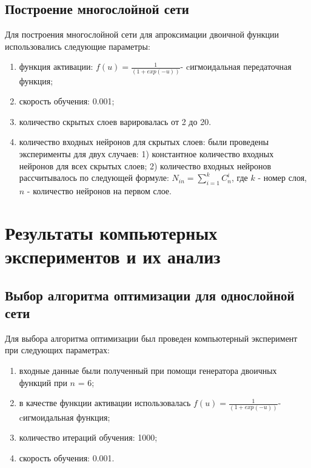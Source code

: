\documentclass[a4paper,12pt,twoside]{article}
\begin{document}
	\subsection{Построение многослойной сети}
	\bigskip
	Для построения многослойной сети для апроксимации двоичной функции использовались следующие параметры:
	\begin{enumerate}
		\item функция активации: $f(u) = \frac{1}{(1 + exp(-u))}$- cигмоидальная передаточная функция;
		\item скорость обучения: 0.001;
		\item количество скрытых слоев варировалась от 2 до 20.
		\item количество входных нейронов для скрытых слоев: были проведены эксперименты для двух случаев: 1) константное количество входных нейронов для всех скрытых слоев; 2) количество входных нейронов рассчитывалось по следующей формуле: $N_{in} = \sum_{i=1}^k C_n^i$, где $k$ - номер слоя, $n$ - количество нейронов на первом слое.
	\end{enumerate}

	\newpage
	\section{Результаты компьютерных экспериментов и их анализ}
		\subsection{Выбор алгоритма оптимизации для однослойной сети}
	Для выбора алгоритма оптимизации был проведен компьютерный эксперимент при следующих параметрах:
	\begin{enumerate}
		\item входные данные были полученный при помощи генератора двоичных функций при $n$ = 6;
		\item в качестве функции активации использовалась $f(u) = \frac{1}{(1 + exp(-u))}$- cигмоидальная функция;
		\item количество итераций обучения: 1000;
		\item скорость обучения: 0.001.
	\end{enumerate}
	
\end{document}
